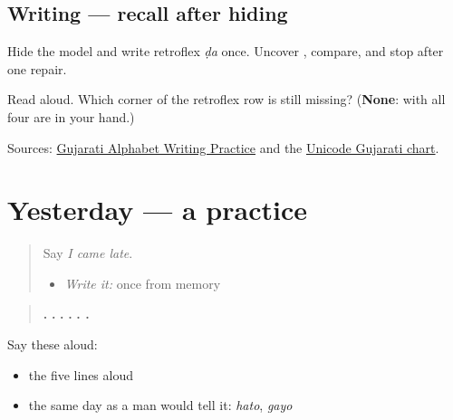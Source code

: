\subsection*{Writing — recall after hiding}
Hide the model and write retroflex \emph{ḍa} once. Uncover \textbf{}, compare, and stop after one repair.

\begin{tcolorbox}[breakable,colback=teal!4,colframe=teal!35!black,title={Before you move on}]
Read \textbf{  } aloud. Which corner of the retroflex row is still missing? (\textbf{None}: with \textbf{} all four are in your hand.)

Sources: \href{https://www.t30apps.com/gujarati-alphabet-writing/}{Gujarati Alphabet Writing Practice} and the \href{https://www.unicode.org/charts/PDF/U0A80.pdf}{Unicode Gujarati chart}.
\end{tcolorbox}
\section[Practice]{Yesterday — a practice}

\label{lesson:GU-C147-past-practice}



\begin{quote}
Say \emph{I came late}.

\begin{itemize}
\raggedright
  \item \emph{Write it:} \textbf{} once from memory
\end{itemize}
\end{quote}

\begin{tcolorbox}[breakable,skin=enhanced,colback=orange!6,colframe=orange!45!black,boxrule=0.5pt,arc=1mm,left=6pt,right=6pt,top=4pt,bottom=4pt,fonttitle=\bfseries,title={Read this}]
\begin{quote}
\textbf{    .} \textbf{   .} \textbf{   .} \textbf{  .} \textbf{   .   .}
\end{quote}

Say these aloud:

\begin{itemize}
\raggedright
  \item the five lines aloud
  \item the same day as a man would tell it: \emph{hato}, \emph{gayo}
\end{itemize}
\end{tcolorbox}

